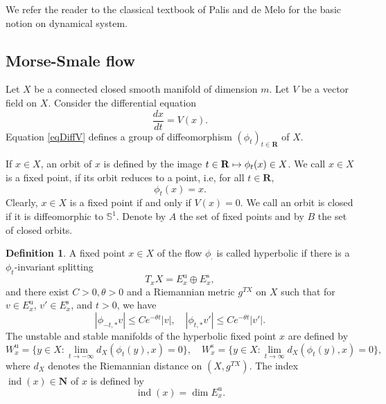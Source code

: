 \documentclass[11pt]{article}
\numberwithin{equation}{section}
\newcommand\mto{\mathchoice{\longmapsto}{\mapsto}{\mapsto}{\mapsto}}
\newcommand{\rs}{\mathrm{s}}
\newcommand{\ru}{\mathrm{u}}
\theoremstyle{plain}
\theoremstyle{definition}
\newtheorem{defin}[lem]{Definition}
\theoremstyle{remark}
\newcommand{\bN}{\mathbf{N}}
\newcommand{\bR}{\mathbf{R}}
\newcommand{\bbS}{\mathbb{S}}
\DeclareMathOperator{\ind}{ind}
\let\l\leqslant
\begin{document}
We refer the reader to the classical textbook of Palis and de
Melo \cite{Palis82} for the basic notion on dynamical system.

\subsection{Morse-Smale flow}\label{sMS}
Let $X$ be a connected closed smooth manifold of dimension $m$. Let $V$ be a
vector field on $X$. Consider the differential equation
\begin{equation}\label{eqDiffV}
\frac{dx}{dt}=V(x).
\end{equation}
Equation \eqref{eqDiffV} defines a group of diffeomorphism
$(\phi_{t})_{t\in \bR}$ of $X$.

If $x\in X$, an orbit of $x$ is defined by the image $t\in \bR\mto
\phi_{t}(x)\in X$. We call $x\in X$ is a fixed point, if its orbit reduces to a point, i.e, for all $t\in \bR$,
\begin{equation*}
\phi_{t}(x)=x.
\end{equation*}
Clearly, $x\in X$ is a fixed point if and only if $V(x)=0$.
We call an orbit is closed if it is diffeomorphic to $\bbS^{1}$.
Denote by $A$ the set of fixed points and by $B$ the set of closed orbits.

\begin{defin}
A fixed point $x\in X$ of the flow $\phi_{\cdot}$ is called
hyperbolic if there is a $\phi_{t}$-invariant splitting\vspace*{-3pt}
\begin{equation*}
T_{x}X= E^{\ru}_{x}\oplus E^{\rs}_{x},
\end{equation*}
and there exist $C>0,\theta>0$ and a Riemannian metric $g^{TX}$ on $X$
such that for $v\in E^{\ru}_{x}$, $v'\in E^{\rs}_{x}$, and $t>0$, we have\vspace*{-3pt}
\begin{equation*}\label{eqMS}
\left|\phi_{- t,*}v\right|\l
Ce^{-\theta t}\left|v\right|,\quad \left|\phi_{ t,*}v'\right|\l
Ce^{-\theta t}\left|v'\right|.
\end{equation*}
The unstable and stable manifolds of the hyperbolic fixed point $x$ are defined by
\begin{equation*}
W^{\ru}_{x}=\Big\{y\in X: \lim_{t\to -
\infty}d_{X}(\phi_{t}(y),x)=0\Big\},\quad W^{\rs}_{x}= \Big\{y\in X: \lim_{t\to
\infty}d_X(\phi_{t}(y),x)=0 \Big\},
\end{equation*}
where $d_{X}$ denotes the Riemannian distance on $(X,g^{TX})$. The index $\ind(x)\in \bN$ of $x$ is defined by\vspace*{-3pt}
\begin{equation}\label{eqindxEu}
\ind(x)=\dim E^{\ru}_{x}.
\end{equation}
\end{defin}
\end{document}
